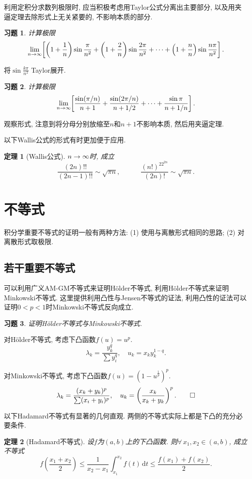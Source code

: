 \documentclass[11pt,a4paper]{ctexart}
\makeatletter
\theoremstyle{thmseries} %
\newtheorem{thm}{定理}[section]
\theoremstyle{exerseries}
\newtheorem{exer}{习题}[section]
\renewenvironment{proof}[1][\proofname]{\par
  \pushQED{\qed}%
  \normalfont \topsep6\p@\@plus6\p@\relax
  \trivlist
  \item[\hskip\labelsep
        \itshape
    #1\@addpunct{}]\ignorespaces
}{%
  \popQED\endtrivlist\@endpefalse
}
\newenvironment{sol}{\begin{proof}[\bfseries\upshape 解\quad]}{\end{proof}}
\newenvironment{pf}{\begin{proof}[\bfseries\upshape 证\quad]}{\end{proof}}
\newcommand{\bra}[1]{\mathopen{}\left(#1\right)}
\newcommand{\sbra}[1]{\mathopen{}\left[#1\right]}
\renewcommand{\d}{\mathrm{d}}
\def \nti {\mathnormal{n}\to\infty}
\makeatother
\begin{document}
利用定积分求数列极限时, 应当积极考虑用Taylor公式分离出主要部分, 以及用夹逼定理去除形式上无关紧要的, 不影响本质的部分. 
\begin{exer}
	计算极限
	\[\lim_{\nti}\sbra{\bra{1+\frac{1}{n}}\sin\frac{\pi}{n^2}+\bra{1+\frac{2}{n}}\sin\frac{2\pi}{n^2}+\cdots+\bra{1+\frac{n}{n}}\sin\frac{n\pi}{n^2}}.\]
\end{exer}
\begin{sol}
	将$\sin\frac{k\pi}{n^2}$ Taylor展开. 
\end{sol}

\begin{exer}
	计算极限
	\[\lim_{\nti}\sbra{\frac{\sin(\pi/n)}{n+1}+\frac{\sin(2\pi/n)}{n+1/2}+\cdots+\frac{\sin\pi}{n+1/n}}.\]
\end{exer}
\begin{sol}
	观察形式, 注意到将分母分别放缩至$n$和$n+1$不影响本质, 然后用夹逼定理. 
\end{sol}

以下Wallis公式的形式有时更加便于应用. 
\begin{thm}[Wallis公式]
	$\nti$时, 成立
	\[\frac{(2n)!!}{(2n-1)!!}\sim\sqrt{\pi n},\quad\qquad\frac{(n!)^22^{2n}}{(2n)!}\sim\sqrt{\pi n}.\]
\end{thm}


\section{不等式}
积分学重要不等式的证明一般有两种方法: (1) 使用与离散形式相同的思路; (2) 对离散形式取极限. 
\subsection{若干重要不等式}
可以利用广义AM-GM不等式来证明H\"older不等式, 利用H\"older不等式来证明Minkowski不等式. 这里提供利用凸性与Jensen不等式的证法, 利用凸性的证法可以证明$0<p<1$时Minkowski不等式反向成立. 
\begin{exer}
	证明H\"older不等式与Minkowski不等式. 
\end{exer}
\begin{pf}
	对H\"older不等式, 考虑下凸函数$f(u)=u^p$. 
	\[\lambda_k=\frac{y_k^q}{\sum y_i^q},\quad u_k=x_ky_k^{1-q}.\]

	对Minkowski不等式, 考虑下凸函数$f(u)=\bra{1-u^{\frac{1}{p}}}^p$. 
	\[\lambda_k=\frac{(x_k+y_k)^p}{\sum(x_i+y_i)^p},\quad u_k=\bra{\frac{x_k}{x_k+y_k}}^p.\qedhere\]
\end{pf}

以下Hadamard不等式有显著的几何直观. 两侧的不等式实际上都是下凸的充分必要条件. 
\begin{thm}[Hadamard不等式]
	设$f$为$(a,b)$上的下凸函数. 则$\forall\,x_1,x_2\in(a,b)$, 成立不等式
	\[f\bra{\frac{x_1+x_2}{2}}\leq\frac{1}{x_2-x_1}\int_{x_1}^{x_2}f(t)\,\d t\leq\frac{f(x_1)+f(x_2)}{2}.\]
\end{thm}
\end{document}
